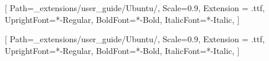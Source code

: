 

\setsansfont{Ubuntu}[
    Path=_extensions/user_guide/Ubuntu/,
    Scale=0.9,
    Extension = .ttf,
    UprightFont=*-Regular,
    BoldFont=*-Bold,
    ItalicFont=*-Italic,
    ]

\setmainfont{Ubuntu}[
    Path=_extensions/user_guide/Ubuntu/,
    Scale=0.9,
    Extension = .ttf,
    UprightFont=*-Regular,
    BoldFont=*-Bold,
    ItalicFont=*-Italic,
    ]